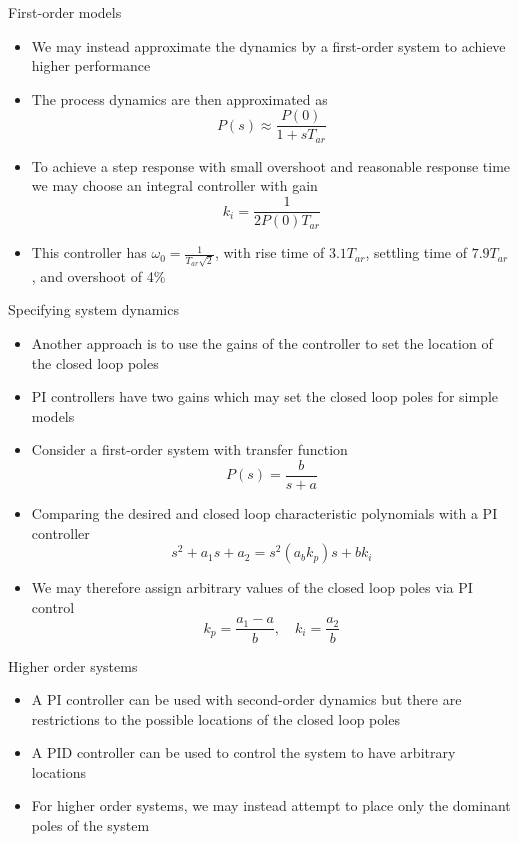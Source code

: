 \documentclass{beamer-control}
\begin{document}
\begin{frame}{First-order models}
\begin{itemize}
	\item We may instead approximate the dynamics by a first-order system to achieve higher performance
	\item The process dynamics are then approximated as 
	\[P(s) \approx \frac{P(0)}{1+sT_{ar}}\]
	\item To achieve a step response with small overshoot and reasonable response time we may choose an integral controller with gain
	\[k_i = \frac{1}{2P(0)T_{ar}}\]
	\item This controller has $\omega_0 = \tfrac{1}{T_{ar}\sqrt{2}}$, with rise time of $3.1 T_{ar}$, settling time of $7.9T_{ar}$, and overshoot of 4\%
\end{itemize}
\end{frame}



\begin{frame}{Specifying system dynamics}
\begin{itemize}
\item Another approach is to use the gains of the controller to set the location of the closed loop poles
\item PI controllers have two gains which may set the closed loop poles for simple models
\item Consider a first-order system with transfer function 
\[P(s) = \frac{b}{s+a}\]
\item Comparing the desired and closed loop characteristic polynomials with a PI controller
\[s^2+a_1s+a_2 = s^2 (a_bk_p)s+bk_i\]
\item We may therefore assign arbitrary values of the closed loop poles via PI control
\[k_p=\frac{a_1-a}{b}, \quad k_i = \frac{a_2}{b}\]
\end{itemize}
\end{frame}

\begin{frame}{Higher order systems}
\begin{itemize}
	\item A PI controller can be used with second-order dynamics but there are restrictions to the possible locations of the closed loop poles
	\item A PID controller can be used to control the system to have arbitrary locations
	\item For higher order systems, we may instead attempt to place only the dominant poles of the system
\end{itemize}
\end{frame}


\SUMMARYFRAME
\FINALE
\end{document}
